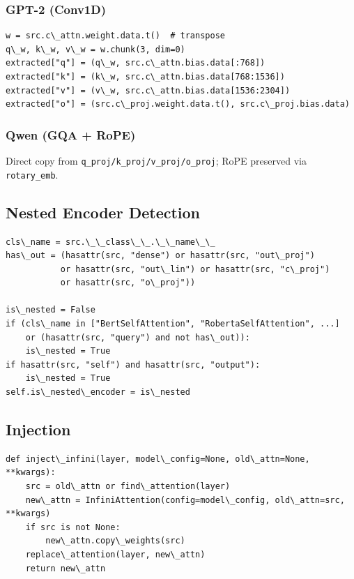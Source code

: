 \subsubsection{GPT-2 (Conv1D)}

\begin{lstlisting}
w = src.c\_attn.weight.data.t()  # transpose
q\_w, k\_w, v\_w = w.chunk(3, dim=0)
extracted["q"] = (q\_w, src.c\_attn.bias.data[:768])
extracted["k"] = (k\_w, src.c\_attn.bias.data[768:1536])
extracted["v"] = (v\_w, src.c\_attn.bias.data[1536:2304])
extracted["o"] = (src.c\_proj.weight.data.t(), src.c\_proj.bias.data)
\end{lstlisting}

\subsubsection{Qwen (GQA + RoPE)}

Direct copy from \texttt{q\_proj/k\_proj/v\_proj/o\_proj}; RoPE preserved via 
\texttt{rotary\_emb}.

\subsection{Nested Encoder Detection}

\begin{lstlisting}
cls\_name = src.\_\_class\_\_.\_\_name\_\_
has\_out = (hasattr(src, "dense") or hasattr(src, "out\_proj")
           or hasattr(src, "out\_lin") or hasattr(src, "c\_proj")
           or hasattr(src, "o\_proj"))

is\_nested = False
if (cls\_name in ["BertSelfAttention", "RobertaSelfAttention", ...]
    or (hasattr(src, "query") and not has\_out)):
    is\_nested = True
if hasattr(src, "self") and hasattr(src, "output"):
    is\_nested = True
self.is\_nested\_encoder = is\_nested
\end{lstlisting}

\subsection{Injection}

\begin{lstlisting}
def inject\_infini(layer, model\_config=None, old\_attn=None, **kwargs):
    src = old\_attn or find\_attention(layer)
    new\_attn = InfiniAttention(config=model\_config, old\_attn=src, **kwargs)
    if src is not None:
        new\_attn.copy\_weights(src)
    replace\_attention(layer, new\_attn)
    return new\_attn
\end{lstlisting}

